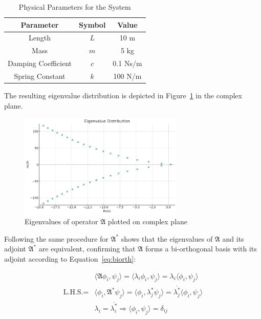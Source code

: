 \begin{table}[h!]
    \centering
    \caption{Physical Parameters for the System}
    \label{tab:pars}
    \begin{tabular}{|c|c|c|}
    \hline
    \textbf{Parameter} & \textbf{Symbol} & \textbf{Value} \\ \hline
    Length             & $L$             & 10 m           \\ \hline
    Mass               & $m$             & 5 kg           \\ \hline
    Damping Coefficient & $c$            & 0.1 Ns/m       \\ \hline
    Spring Constant    & $k$             & 100 N/m        \\ \hline
    \end{tabular}
\end{table}

The resulting eigenvalue distribution is depicted in Figure~\ref{fig:eigval_dist} in the complex plane.

\begin{figure}[ht]
    \centering
    \includegraphics[width=0.7\textwidth]{Figures/eigval_dist_R_0.3.jpg}
    \caption{Eigenvalues of operator $\mathfrak{A}$ plotted on complex plane}
    \label{fig:eigval_dist}
\end{figure}

Following the same procedure for $\mathfrak{A}^*$ shows that the eigenvalues of $\mathfrak{A}$ and its adjoint $\mathfrak{A}^*$ are equivalent, confirming that $\mathfrak{A}$ forms a bi-orthogonal basis with its adjoint according to Equation~\ref{eq:biorth}:

\begin{equation} \label{eq:biorth}
    \begin{aligned}
        &\langle \mathfrak{A} \phi_i, \psi_j \rangle = \langle \lambda_i \phi_i, \psi_j \rangle = \lambda_i \langle \phi_i, \psi_j \rangle \\
        \text{L.H.S.} = &\langle \phi_i, \mathfrak{A}^* \psi_j \rangle = \langle \phi_i, \lambda_j^* \psi_j \rangle = \overline{\lambda_j^*} \langle \phi_i, \psi_j \rangle \\
        &\lambda_i = \overline{\lambda_i^*} \Rightarrow \langle \phi_i, \psi_j \rangle = \delta_{ij}
    \end{aligned}
\end{equation}

